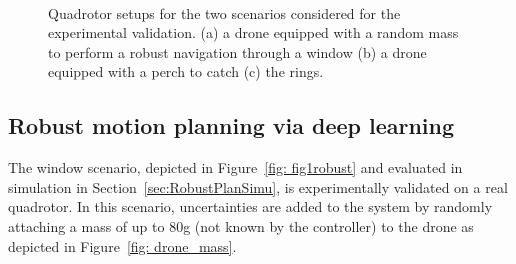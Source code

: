 \begin{figure} [htp]
    \centering
    
     \\%
    \caption{Quadrotor setups for the two scenarios considered for the experimental validation. (a) a drone equipped with a random mass to perform a robust navigation through a window (b) a drone equipped with a perch to catch (c) the rings.}%
    \label{fig: exp setup}%
\end{figure}

\subsection{Robust motion planning via deep learning} \label{sec:RobustPlanExp}

The window scenario, depicted in Figure~\ref{fig: fig1robust} and evaluated in simulation in Section~\ref{sec:RobustPlanSimu}, is experimentally validated on a real quadrotor.
In this scenario, uncertainties are added to the system by randomly attaching a mass of up to 80g (not known by the controller) to the drone as depicted in Figure~\ref{fig: drone_mass}.

